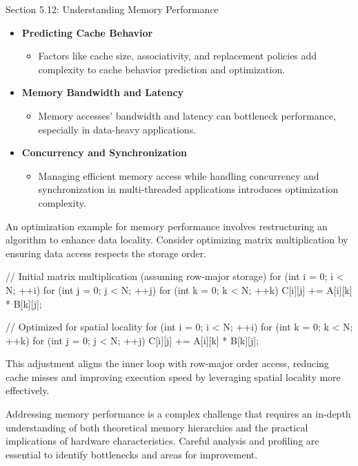 \begin{notes}{Section 5.12: Understanding Memory Performance}
    \begin{itemize}
        \item \textbf{Predicting Cache Behavior}
        \begin{itemize}
            \item Factors like cache size, associativity, and replacement policies add complexity to cache behavior prediction and optimization.
        \end{itemize}
        \item \textbf{Memory Bandwidth and Latency}
        \begin{itemize}
            \item Memory accesses' bandwidth and latency can bottleneck performance, especially in data-heavy applications.
        \end{itemize}
        \item \textbf{Concurrency and Synchronization}
        \begin{itemize}
            \item Managing efficient memory access while handling concurrency and synchronization in multi-threaded applications introduces optimization complexity.
        \end{itemize}
    \end{itemize}
    
    \begin{highlight}
        An optimization example for memory performance involves restructuring an algorithm to enhance data locality. Consider optimizing matrix multiplication by ensuring data access respects the 
        storage order.
    
    \begin{code}[C]
    // Initial matrix multiplication (assuming row-major storage)
    for (int i = 0; i < N; ++i) {
        for (int j = 0; j < N; ++j) {
            for (int k = 0; k < N; ++k) {
                C[i][j] += A[i][k] * B[k][j];
            }
        }
    }
    
    // Optimized for spatial locality
    for (int i = 0; i < N; ++i) {
        for (int k = 0; k < N; ++k) {
            for (int j = 0; j < N; ++j) {
                C[i][j] += A[i][k] * B[k][j];
            }
        }
    }
    \end{code}
        This adjustment aligns the inner loop with row-major order access, reducing cache misses and improving execution speed by leveraging spatial locality more effectively.
    \end{highlight}
    
    Addressing memory performance is a complex challenge that requires an in-depth understanding of both theoretical memory hierarchies and the practical implications of hardware characteristics. 
    Careful analysis and profiling are essential to identify bottlenecks and areas for improvement.
\end{notes}


